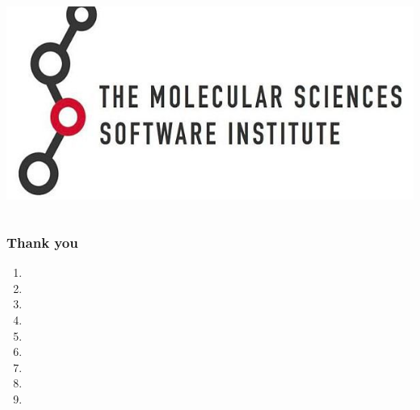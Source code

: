 \documentclass[%
    xcolor=usenames,dvipsnames,svgnames%
]{beamer}
\begin{document}
\begin{frame}
\begin{columns}
\begin{minipage}{1.0\linewidth}
      \includegraphics[width=0.95\linewidth,keepaspectratio]{./figures/logo_molssi_text.jpg}
    \end{minipage}
  \end{columns}
\end{frame}

\begin{frame}
  \frametitle{Thank you}
  \scriptsize
  \begin{enumerate}
  \item {}
  \item {}
  \item {}
  \item {}
  \item {}
  \item {}
  \item {}
  \item {}
  \item {}
  \end{enumerate}
\end{frame}

\appendix
\end{document}
